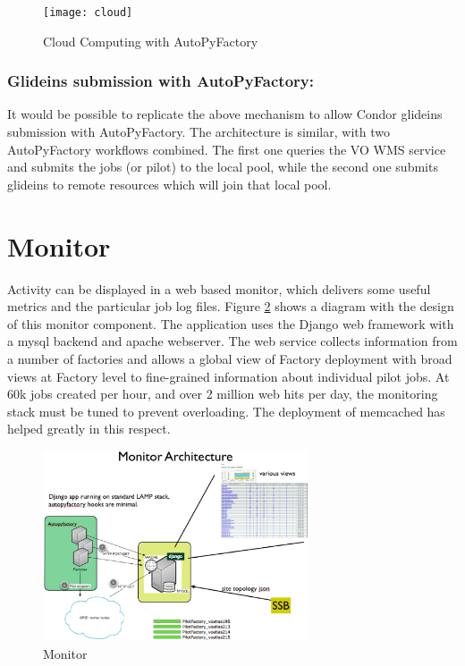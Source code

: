 \documentclass[a4paper]{jpconf}
\begin{document}
\begin{figure}[h]
\centering\texttt{[image: cloud]}
\caption{Cloud Computing with AutoPyFactory}
\label{cloud}
\end{figure}

\subsubsection{Glideins submission with AutoPyFactory:}
It would be possible to replicate the above mechanism to allow Condor glideins submission with AutoPyFactory.
The architecture is similar, with two AutoPyFactory workflows combined.
The first one queries the VO WMS service and submits the jobs (or pilot) to the local pool, 
while the second one submits glideins to remote resources which will join that local pool. 

\section{Monitor}

Activity can be displayed in a web based monitor, which delivers some useful metrics and the particular job log files.  
Figure \ref{monitor} shows a diagram with the design of this monitor component.
The application uses the Django web framework with a mysql backend and apache webserver. 
The web service collects information from a number of
factories and allows a global view of Factory deployment with broad
views at Factory level to fine-grained information about individual pilot jobs. 
At 60k jobs created per hour, and over 2 million web hits per day, 
the monitoring stack must be tuned to prevent overloading.
The deployment of memcached has helped greatly in this respect.


\begin{figure}
\centering\includegraphics[width=0.7\textwidth]{monitor}
\caption{Monitor}
\label{monitor}
\end{figure}
\end{document}
